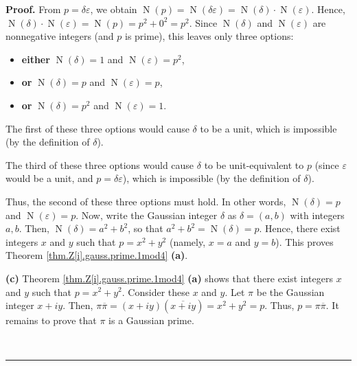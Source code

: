 \documentclass[numbers=enddot,12pt,final,onecolumn,notitlepage]{scrartcl}%
\numberwithin{exer}{subsection}
\theoremstyle{definition}
\newenvironment{proof}[1][Proof]{\noindent\textbf{#1.} }{\ \rule{0.5em}{0.5em}}
\begin{document}
\begin{proof}
From $p=\delta\varepsilon$, we obtain $\operatorname*{N}\left(  p\right)
=\operatorname*{N}\left(  \delta\varepsilon\right)  =\operatorname*{N}\left(
\delta\right)  \cdot\operatorname*{N}\left(  \varepsilon\right)  $. Hence,
$\operatorname*{N}\left(  \delta\right)  \cdot\operatorname*{N}\left(
\varepsilon\right)  =\operatorname*{N}\left(  p\right)  =p^{2}+0^{2}=p^{2}$.
Since $\operatorname*{N}\left(  \delta\right)  $ and $\operatorname*{N}\left(
\varepsilon\right)  $ are nonnegative integers (and $p$ is prime), this leaves
only three options:

\begin{itemize}
\item \textbf{either} $\operatorname*{N}\left(  \delta\right)  =1$ and
$\operatorname*{N}\left(  \varepsilon\right)  =p^{2}$,

\item \textbf{or }$\operatorname*{N}\left(  \delta\right)  =p$ and
$\operatorname*{N}\left(  \varepsilon\right)  =p$,

\item \textbf{or }$\operatorname*{N}\left(  \delta\right)  =p^{2}$ and
$\operatorname*{N}\left(  \varepsilon\right)  =1$.
\end{itemize}

The first of these three options would cause $\delta$ to be a unit, which is
impossible (by the definition of $\delta$).

The third of these three options would cause $\delta$ to be unit-equivalent to
$p$ (since $\varepsilon$ would be a unit, and $p=\delta\varepsilon$), which is
impossible (by the definition of $\delta$).

Thus, the second of these three options must hold. In other words,
$\operatorname*{N}\left(  \delta\right)  =p$ and $\operatorname*{N}\left(
\varepsilon\right)  =p$. Now, write the Gaussian integer $\delta$ as
$\delta=\left(  a,b\right)  $ with integers $a,b$. Then, $\operatorname*{N}%
\left(  \delta\right)  =a^{2}+b^{2}$, so that $a^{2}+b^{2}=\operatorname*{N}%
\left(  \delta\right)  =p$. Hence, there exist integers $x$ and $y$ such that
$p=x^{2}+y^{2}$ (namely, $x=a$ and $y=b$). This proves Theorem
\ref{thm.Z[i].gauss.prime.1mod4} \textbf{(a)}.

\textbf{(c)} Theorem \ref{thm.Z[i].gauss.prime.1mod4} \textbf{(a)} shows that
there exist integers $x$ and $y$ such that $p=x^{2}+y^{2}$. Consider these $x$
and $y$. Let $\pi$ be the Gaussian integer $x+iy$. Then, $\pi\overline{\pi
}=\left(  x+iy\right)  \left(  \overline{x+iy}\right)  =x^{2}+y^{2}=p$. Thus,
$p=\pi\overline{\pi}$. It remains to prove that $\pi$ is a Gaussian prime.


\end{proof}
\end{document}
